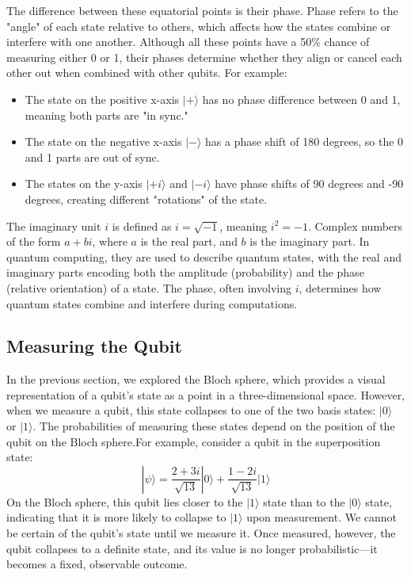 The difference between these equatorial points is their phase. Phase refers to the "angle" of each state relative to others, which affects how the states combine or interfere with one another. Although all these points have a 50\% chance of measuring either 0 or 1, their phases determine whether they align or cancel each other out when combined with other qubits. For example:
\begin{itemize}
    \item The state on the positive x-axis \( |+\rangle \) has no phase difference between 0 and 1, meaning both parts are "in sync."
    \item The state on the negative x-axis \( |-\rangle \) has a phase shift of 180 degrees, so the 0 and 1 parts are out of sync.
    \item The states on the y-axis \( |+i\rangle \) and \( |-i\rangle \) have phase shifts of 90 degrees and -90 degrees, creating different "rotations" of the state.
\end{itemize} 
\vspace{0.1cm}

\begin{tcolorbox}[colback=gray!5!white, colframe=gray!75!black, title=Note on \(i\)]
The imaginary unit \( i \) is defined as \( i = \sqrt{-1} \), meaning \( i^2 = -1 \). Complex numbers  of the form \( a + bi \), where \( a \) is the real part, and \( b \) is the imaginary part. In quantum computing, they are used to describe quantum states, with the real and imaginary parts encoding both the amplitude (probability) and the phase (relative orientation) of a state. The phase, often involving \( i \), determines how quantum states combine and interfere during computations.
\end{tcolorbox}


\subsection{Measuring the Qubit}

In the previous section, we explored the Bloch sphere, which provides a visual representation of a qubit's state as a point in a three-dimensional space. However, when we measure a qubit, this state collapses to one of the two basis states: \( |0\rangle \) or \( |1\rangle \). The probabilities of measuring these states depend on the position of the qubit on the Bloch sphere.For example,  consider a qubit in the superposition state:
\vspace{0.1em}
\[
|\psi\rangle = \frac{2 + 3i}{\sqrt{13}} |0\rangle + \frac{1 - 2i}{\sqrt{13}} |1\rangle
\]
\vspace{0.1em}On the Bloch sphere, this qubit lies closer to the \( |1\rangle \) state than to the \( |0\rangle \) state, indicating that it is more likely to collapse to \( |1\rangle \) upon measurement. We cannot be certain of the qubit's state until we measure it. Once measured, however, the qubit collapses to a definite state, and its value is no longer probabilistic—it becomes a fixed, observable outcome.



